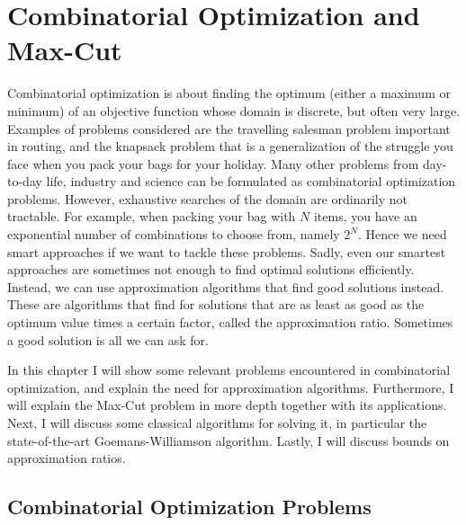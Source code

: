 \chapter{Combinatorial Optimization and Max-Cut}
\label{chap:combop}

Combinatorial optimization is about finding the optimum (either a maximum or minimum) of an objective function whose domain is discrete, but often very large. Examples of problems considered are the travelling salesman problem \cite{TSP} important in routing, and the knapsack problem \cite{Knapsack1,Knapsack2} that is a generalization of the struggle you face when you pack your bags for your holiday. Many other problems from day-to-day life, industry and science can be formulated as combinatorial optimization problems. However, exhaustive searches of the domain are ordinarily not tractable. For example, when packing your bag with $N$ items, you have an exponential number of combinations to choose from, namely $2^N$. Hence we need smart approaches if we want to tackle these problems. Sadly, even our smartest approaches are sometimes not enough to find optimal solutions efficiently. Instead, we can use approximation algorithms that find good solutions instead. These are algorithms that find for solutions that are as least as good as the optimum value times a certain factor, called the approximation ratio. Sometimes a good solution is all we can ask for.

In this chapter I will show some relevant problems encountered in combinatorial optimization, and explain the need for approximation algorithms. Furthermore, I will explain the Max-Cut problem in more depth together with its applications. Next, I will discuss some classical algorithms for solving it, in particular the state-of-the-art Goemans-Williamson algorithm. Lastly, I will discuss bounds on approximation ratios.

\section{Combinatorial Optimization Problems}

